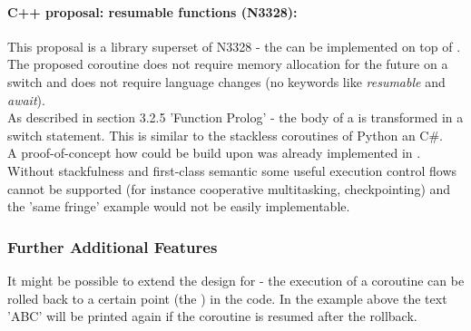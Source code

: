 \paragraph*{C++ proposal: resumable functions (N3328\cite{n3328}):}
This proposal is a library superset of N3328 - the \resumfn can be implemented
on top of \coro. The proposed coroutine does not require memory allocation for
the future on a switch and does not require language changes (no keywords like
\textit{resumable} and \textit{await}).\\
As described in section 3.2.5 'Function Prolog' - the body of a \resumfn is
transformed in a switch statement. This is similar to the stackless coroutines
of Python an C\#.\\
A proof-of-concept how \await could be build upon \boostcoroutine was already
implemented in \awaitemu.\\
\newline
Without stackfulness and first-class semantic some useful execution control
flows cannot be supported (for instance cooperative multitasking,
checkpointing) and the 'same fringe' example would not be easily implementable.

\subsubsection*{Further Additional Features}
It might be possible to extend the design for \checkpointing - the execution of
a coroutine can be rolled back to a certain point (the \checkpoint) in the code.
In the example above the text 'ABC' will be printed again if the coroutine
is resumed after the rollback.

